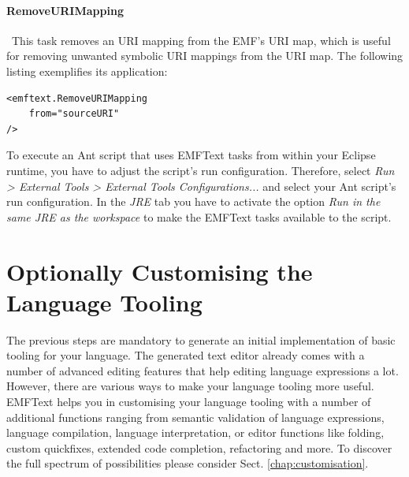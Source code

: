 \paragraph*{RemoveURIMapping}~This task removes an URI mapping from the EMF's
URI map, which is useful for removing unwanted symbolic URI mappings from the URI map. 
The following listing exemplifies its application: 
\begin{lstlisting}
<emftext.RemoveURIMapping
	from="sourceURI"
/>
\end{lstlisting}
	
	
	To execute an Ant script that uses EMFText tasks from within your Eclipse
	runtime, you have to adjust the script's run configuration. Therefore, select 
	\emph{Run > External Tools > External Tools Configurations...} and select 
	your Ant script's run configuration. In the \emph{JRE} tab you have to
	activate the option \emph{Run in the same JRE as the workspace} to make the
	EMFText tasks available to the script.
	
\section{Optionally Customising the Language Tooling}

The previous steps are mandatory to generate an initial implementation of
basic tooling for your language. The generated text editor already
comes with a number of advanced editing features that help editing language
expressions a lot. However, there are various ways to make your language tooling
more useful. EMFText helps you in customising your language tooling with a
number of additional functions ranging from semantic validation of language
expressions, language compilation, language interpretation, or editor functions
like folding, custom quickfixes, extended code completion, refactoring and more.
To discover the full spectrum of possibilities please consider Sect.
\ref{chap:customisation}.
